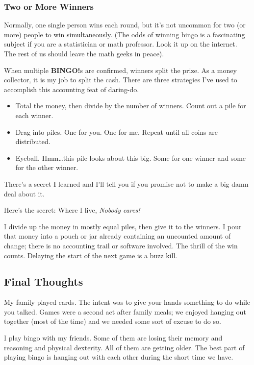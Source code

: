 \documentclass[
  letterpaper,
  DIV=11,
  numbers=noendperiod]{scrartcl}
\begin{document}
\hypertarget{two-or-more-winners}{%
\subsubsection{Two or More Winners}\label{two-or-more-winners}}

Normally, one single person wins each round, but it's not uncommon for
two (or more) people to win simultaneously. (The odds of winning bingo
is a fascinating subject if you are a statistician or math professor.
Look it up on the internet. The rest of us should leave the math geeks
in peace).

When multiple \textbf{BINGO!}s are confirmed, winners split the prize.
As a money collector, it is my job to split the cash. There are three
strategies I've used to accomplish this accounting feat of daring-do.

\begin{itemize}
\item
  Total the money, then divide by the number of winners. Count out a
  pile for each winner.
\item
  Drag into piles. One for you. One for me. Repeat until all coins are
  distributed.
\item
  Eyeball. Hmm\ldots this pile looks about this big. Some for one winner
  and some for the other winner.
\end{itemize}

There's a secret I learned and I'll tell you if you promise not to make
a big damn deal about it.

Here's the secret: Where I live, \emph{Nobody cares!}

I divide up the money in mostly equal piles, then give it to the
winners. I pour that money into a pouch or jar already containing an
uncounted amount of change; there is no accounting trail or software
involved. The thrill of the win counts. Delaying the start of the next
game is a buzz kill.

\hypertarget{final-thoughts}{%
\subsection{Final Thoughts}\label{final-thoughts}}

My family played cards. The intent was to give your hands something to
do while you talked. Games were a second act after family meals; we
enjoyed hanging out together (most of the time) and we needed some sort
of excuse to do so.

I play bingo with my friends. Some of them are losing their memory and
reasoning and physical dexterity. All of them are getting older. The
best part of playing bingo is hanging out with each other during the
short time we have.
\end{document}
